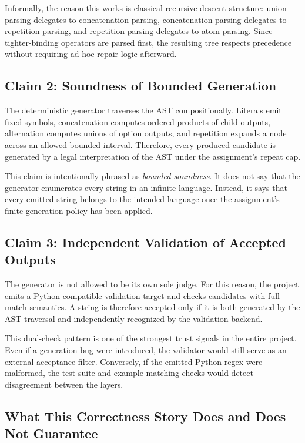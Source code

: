 \documentclass[a4paper,12pt]{article}
\begin{document}
Informally, the reason this works is classical recursive-descent structure: union parsing delegates to concatenation parsing, concatenation parsing delegates to repetition parsing, and repetition parsing delegates to atom parsing. Since tighter-binding operators are parsed first, the resulting tree respects precedence without requiring ad-hoc repair logic afterward.

\subsection{Claim 2: Soundness of Bounded Generation}

The deterministic generator traverses the AST compositionally. Literals emit fixed symbols, concatenation computes ordered products of child outputs, alternation computes unions of option outputs, and repetition expands a node across an allowed bounded interval. Therefore, every produced candidate is generated by a legal interpretation of the AST under the assignment's repeat cap.

This claim is intentionally phrased as \emph{bounded soundness}. It does not say that the generator enumerates every string in an infinite language. Instead, it says that every emitted string belongs to the intended language once the assignment's finite-generation policy has been applied.

\subsection{Claim 3: Independent Validation of Accepted Outputs}

The generator is not allowed to be its own sole judge. For this reason, the project emits a Python-compatible validation target and checks candidates with full-match semantics. A string is therefore accepted only if it is both generated by the AST traversal and independently recognized by the validation backend.

This dual-check pattern is one of the strongest trust signals in the entire project. Even if a generation bug were introduced, the validator would still serve as an external acceptance filter. Conversely, if the emitted Python regex were malformed, the test suite and example matching checks would detect disagreement between the layers.

\subsection{What This Correctness Story Does and Does Not Guarantee}
\end{document}
